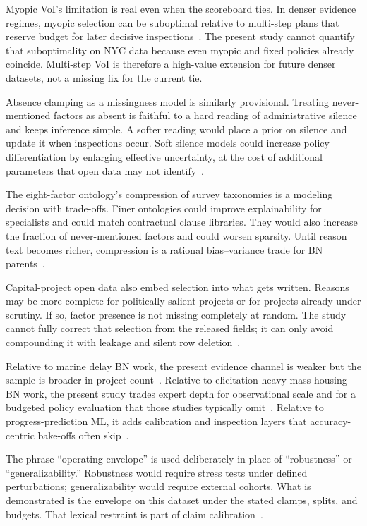 Myopic VoI's limitation is real even when the scoreboard ties. In denser evidence regimes, myopic selection can be suboptimal relative to multi-step plans that reserve budget for later decisive inspections~\cite{Memarzadeh2016,Fauriat2020}. The present study cannot quantify that suboptimality on NYC data because even myopic and fixed policies already coincide. Multi-step VoI is therefore a high-value extension for future denser datasets, not a missing fix for the current tie.

Absence clamping as a missingness model is similarly provisional. Treating never-mentioned factors as absent is faithful to a hard reading of administrative silence and keeps inference simple. A softer reading would place a prior on silence and update it when inspections occur. Soft silence models could increase policy differentiation by enlarging effective uncertainty, at the cost of additional parameters that open data may not identify~\cite{Heckerman1996,Song2021}.

The eight-factor ontology's compression of survey taxonomies is a modeling decision with trade-offs. Finer ontologies could improve explainability for specialists and could match contractual clause libraries. They would also increase the fraction of never-mentioned factors and could worsen sparsity. Until reason text becomes richer, compression is a rational bias--variance trade for BN parents~\cite{Assaf2006,Onisko2001}.

Capital-project open data also embed selection into what gets written. Reasons may be more complete for politically salient projects or for projects already under scrutiny. If so, factor presence is not missing completely at random. The study cannot fully correct that selection from the released fields; it can only avoid compounding it with leakage and silent row deletion~\cite{Woldesenbet2016,Flyvbjerg2009}.

Relative to marine delay BN work, the present evidence channel is weaker but the sample is broader in project count~\cite{Comu2023}. Relative to elicitation-heavy mass-housing BN work, the present study trades expert depth for observational scale and for a budgeted policy evaluation that those studies typically omit~\cite{Khodabakhshian2025}. Relative to progress-prediction ML, it adds calibration and inspection layers that accuracy-centric bake-offs often skip~\cite{Tagharobi2025,Egwim2021}.

The phrase ``operating envelope'' is used deliberately in place of ``robustness'' or ``generalizability.'' Robustness would require stress tests under defined perturbations; generalizability would require external cohorts. What is demonstrated is the envelope on this dataset under the stated clamps, splits, and budgets. That lexical restraint is part of claim calibration~\cite{Gneiting2007,Memarzadeh2016}.

